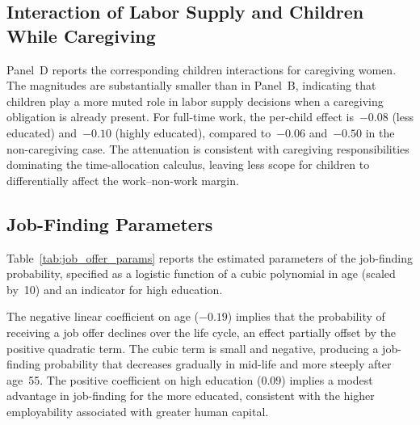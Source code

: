 \subsection{Interaction of Labor Supply and Children While Caregiving}
\label{sec:results_children_care}

Panel~D reports the corresponding children interactions for caregiving
women.  The magnitudes are substantially smaller than in Panel~B,
indicating that children play a more muted role in labor supply decisions
when a caregiving obligation is already present.  For full-time work, the
per-child effect is~$-0.08$ (less educated) and~$-0.10$ (highly educated),
compared to~$-0.06$ and~$-0.50$ in the non-caregiving case.  The
attenuation is consistent with caregiving responsibilities dominating the
time-allocation calculus, leaving less scope for children to differentially
affect the work--non-work margin.




\subsection{Job-Finding Parameters}
\label{sec:results_job_finding}

Table~\ref{tab:job_offer_params} reports the estimated parameters of
the job-finding probability, specified as a logistic function of a
cubic polynomial in age (scaled by~10) and an indicator for high
education.

The negative linear coefficient on age ($-0.19$) implies that the
probability of receiving a job offer declines over the life cycle, an
effect partially offset by the positive quadratic term.  The cubic
term is small and negative, producing a job-finding probability that
decreases gradually in mid-life and more steeply after age~55.  The
positive coefficient on high education ($0.09$) implies a modest
advantage in job-finding for the more educated, consistent with the
higher employability associated with greater human capital.




